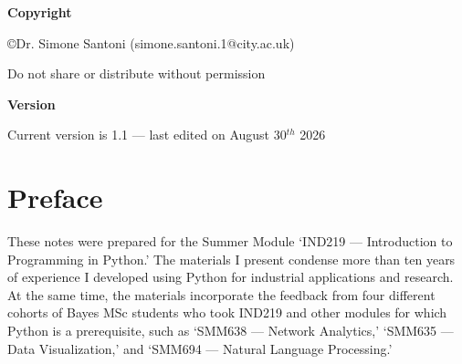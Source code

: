 \documentclass[a4paper,11pt]{book}
\begin{document}

\clearpage
\centering 


\vspace{6em}

\textbf{Copyright}

\copyright Dr. Simone Santoni (simone.santoni.1@city.ac.uk)

Do not share or distribute without permission

\vspace{3em}

\textbf{Version}

Current version is 1.1 --- last edited on August 30$^{th}$ 2026
\clearpage

\tableofcontents

\listoffigures

\listoftables

\clearpage

\mainmatter
\chapter*{Preface}

\raggedright These notes were prepared for the Summer Module `IND219 --- Introduction to Programming in Python.' The materials I present condense more than ten years of experience I developed using Python for industrial applications and research. At the same time, the materials incorporate the feedback from four different cohorts of Bayes MSc students who took IND219 and other modules for which Python is a prerequisite, such as `SMM638 --- Network Analytics,' `SMM635 --- Data Visualization,' and `SMM694 --- Natural Language Processing.' 
\end{document}
